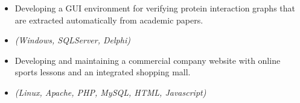 \begin{itemize}
 \item {Developing a GUI environment for verifying protein interaction graphs
	 that are extracted automatically from academic papers.}
 \item{\it\small(Windows, SQLServer, Delphi)}
\end{itemize}

\begin{itemize}
 \item{Developing and maintaining a commercial company website with 
       online sports lessons and an integrated shopping mall.}
 \item{\it\small(Linux, Apache, PHP, MySQL, HTML, Javascript)}
\end{itemize}
